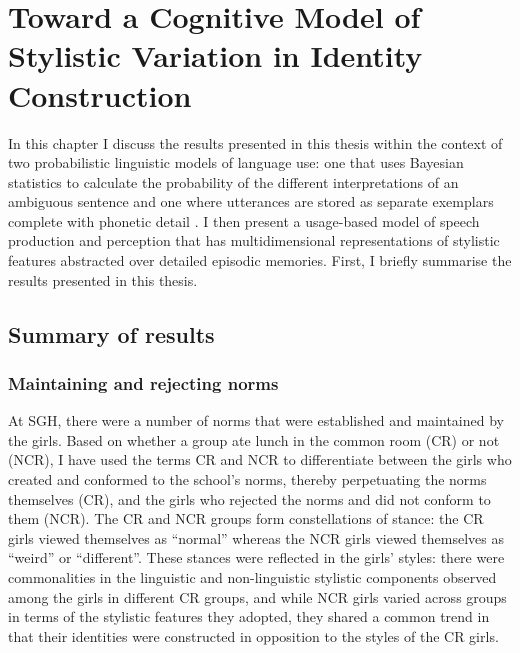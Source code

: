 \chapter{Toward a Cognitive Model of Stylistic Variation in Identity Construction}\label{ch:disc}

\date{}


\noindent In this chapter I discuss the results presented in this thesis within the context of two probabilistic linguistic models of language use: one that uses Bayesian statistics to calculate the probability of the different interpretations of an ambiguous sentence \cite{jurafsky1996,narayananjurafsky2002} and one where utterances are stored as separate exemplars complete with phonetic detail \cite{johnson1997,pierrehumbert2001}.  I then present a usage-based model of speech production and perception that has multidimensional representations of stylistic features abstracted over detailed episodic memories.  First, I briefly summarise the results presented in this thesis.


\section{Summary of results}
 \subsection{Maintaining and rejecting norms}

At SGH, there were a number of norms that were established and maintained by the girls.  Based on whether a group ate lunch in the common room (CR) or not (NCR), I have used the terms CR and NCR to differentiate between the girls who created and conformed to the school's norms, thereby perpetuating the norms themselves (CR), and the girls who rejected the norms and did not conform to them (NCR).  The CR and NCR groups form constellations of stance: the CR girls viewed themselves as ``normal'' whereas the NCR girls viewed themselves as ``weird'' or ``different''.  These stances were reflected in the girls' styles: there were commonalities in the linguistic and non-linguistic stylistic components observed among the girls in different CR groups, and while NCR girls varied across groups in terms of the stylistic features they adopted, they shared a common trend in that their identities were constructed in opposition to the styles of the CR girls.


